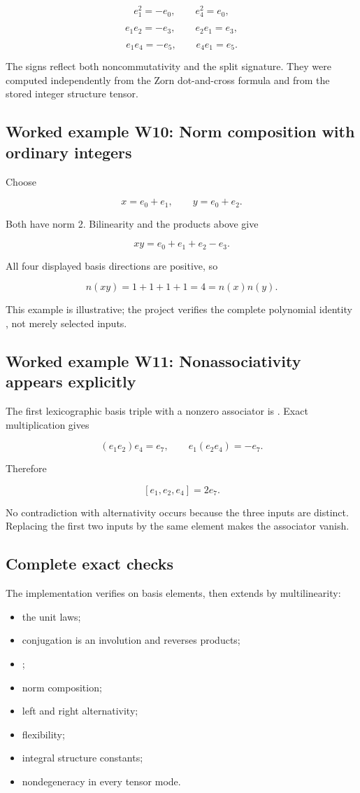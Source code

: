 \documentclass[11pt]{article}
\begin{document}
\[
e_1^2=-e_0,\qquad e_4^2=e_0,
\]

\[
e_1e_2=-e_3,\qquad e_2e_1=e_3,
\]

\[
e_1e_4=-e_5,\qquad e_4e_1=e_5.
\]

The signs reflect both noncommutativity and the split signature. They were computed independently from the Zorn dot-and-cross formula and from the stored integer structure tensor.

\subsection{Worked example W10: Norm composition with ordinary integers}

Choose

\[
x=e_0+e_1,\qquad y=e_0+e_2.
\]

Both have norm 2. Bilinearity and the products above give

\[
xy=e_0+e_1+e_2-e_3.
\]

All four displayed basis directions are positive, so

\[
n(xy)=1+1+1+1=4=n(x)n(y).
\]

This example is illustrative; the project verifies the complete polynomial identity \texttt{}, not merely selected inputs.

\subsection{Worked example W11: Nonassociativity appears explicitly}

The first lexicographic basis triple with a nonzero associator is \texttt{}. Exact multiplication gives

\[
(e_1e_2)e_4=e_7,
\qquad
e_1(e_2e_4)=-e_7.
\]

Therefore

\[
[e_1,e_2,e_4]=2e_7.
\]

No contradiction with alternativity occurs because the three inputs are distinct. Replacing the first two inputs by the same element makes the associator vanish.

\subsection{Complete exact checks}

The implementation verifies on basis elements, then extends by multilinearity:

\begin{itemize}
\item the unit laws;
\item conjugation is an involution and reverses products;
\item \texttt{};
\item norm composition;
\item left and right alternativity;
\item flexibility;
\item integral structure constants;
\item nondegeneracy in every tensor mode.
\end{itemize}
\end{document}
